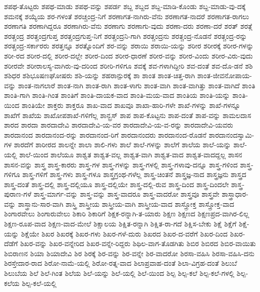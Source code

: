 {ಶಪಥ-ತೊಟ್ಟರು
ಶಪಥ-ಮಾಡು
ಶಪಥ-ವನ್ನು
ಶಪರ್ಡ
ಶಬ್ದ
ಶಬ್ದದ
ಶಬ್ದ-ಮಾಡಿ-ಕೊಂಡು
ಶಬ್ದ-ಮಾಡು-ವು-ದಕ್ಕೆ
ಶಮನಕ್ಕೆ
ಶಯ್ಯೆಯ
ಶರ-ಗಳಂತೆ
ಶರಚ್ಚಂದ್ರ-ನಿಗೆ
ಶರಣಾಗತ-ನಾಗಿರು-ವೆನು
ಶರಣಾಗತ-ನಾದರೆ
ಶರಣಾಗತ-ರಾಗಲು
ಶರಣಾಗತಿ
ಶರಣಾಗಿದ್ದರೂ
ಶರಣಾಗಿರು-ವೆನು
ಶರಣಾಗು
ಶರಣಾಗು-ವುದು
ಶರಣಾ-ದರು
ಶರಣಾ-ದರೆ
ಶರತ್
ಶರತ್ಗೆ
ಶರತ್ಚಂದ್ರ
ಶರತ್ಚಂದ್ರಗುಪ್ತ
ಶರತ್ಚಂದ್ರಗುಪ್ತ-ನಿಗೆ
ಶರತ್ಚಂದ್ರನಿ-ಗಾಗಿ
ಶರತ್ಚಂದ್ರನು
ಶರತ್ಚಂದ್ರ-ನೊಡನೆ
ಶರತ್ಚಂದ್ರ-ರನ್ನು
ಶರತ್ಚಂದ್ರ-ಸರ್ಕಾರರು
ಶರತ್ತನ್ನೂ
ಶರತ್ನೊಂದಿಗೆ
ಶರ-ವನ್ನು
ಶರಾಯಿ
ಶರಾಯಿ-ಯನ್ನು
ಶರೀರ
ಶರೀರಕ್ಕೆ
ಶರೀರ-ಗಳನ್ನು
ಶರೀ-ರದ
ಶರೀರ-ದಲ್ಲಿ
ಶರೀರ-ದಲ್ಲೇ
ಶರೀರ-ದಿಂದ
ಶರೀರ-ಧಾರಣೆ
ಶರೀರ-ವನ್ನು
ಶರೀರ-ವಿಂದು
ಶರೀರ-ವಿರು-ವುದು
ಶರೀರವೇ
ಶರೀರಾಲಸ್ಯ-ವಾಗಿರು-ವು-ದರಿಂದ
ಶರೀರಿ-ಗಳಿಗೂ
ಶವಕ್ಕೆ
ಶವ-ಗಳಾಗಿದ್ದೀರಿ
ಶವ-ದಂತೆ
ಶವ-ದೊ-ಡನೆ
ಶಶಿ
ಶಶಿಧರ
ಶಶಿಭೂಷಣಘೋಷರು
ಶಶಿ-ಯನ್ನು
ಶಹರಾನ್ಪುರಕ್ಕೆ
ಶಾ
ಶಾಂತ
ಶಾಂತ-ಚಿತ್ತ-ರಾಗಿ
ಶಾಂತ-ಜೀವನೋಪಾಯ-ವನ್ನು
ಶಾಂತ-ನಾಗಲಾರೆ
ಶಾಂತ-ನಾಗಿ
ಶಾಂತ-ರಾಗಿ
ಶಾಂತ-ಳಾಗು
ಶಾಂತ-ವಾಗಿ
ಶಾಂತ-ವಾಗಿತ್ತು
ಶಾಂತ-ವಾಗಿದೆ
ಶಾಂತಿ
ಶಾಂತಿ-ಗಾಗಿ
ಶಾಂತಿ-ಗಿಂತ
ಶಾಂತಿಗೆ
ಶಾಂತಿ-ದಾಯಕ-ವಾದ
ಶಾಂತಿ-ಮಯ-ವಾದ
ಶಾಂತಿಯ
ಶಾಂತಿ-ಯನ್ನು
ಶಾಂತಿ-ಯಿಂದ
ಶಾಂತಿಯೇ
ಶಾಕ್ತರು
ಶಾಕ್ತರೂ
ಶಾಖ-ವಾದ
ಶಾಖವೂ
ಶಾಖಾ-ಹಾರಿ-ಗಳೇ
ಶಾಖೆ-ಗಳನ್ನು
ಶಾಖೆ-ಗಳನ್ನೂ
ಶಾಖೆಗೆ
ಶಾಖೆಯ
ಶಾಖೋಪಶಾಖೆ-ಗಳಿಗೆಲ್ಲ
ಶಾನ್ಬ್ರಸ್
ಶಾಪ
ಶಾಪ-ಕೊಟ್ಟನು
ಶಾಪ-ದಂತೆ
ಶಾಪ-ವನ್ನು
ಶಾಮಲದಾಸ
ಶಾರದ
ಶಾರದಾ
ಶಾರದಾದೇವಿ
ಶಾರದಾದೇವಿ-ಯ-ವರ
ಶಾರದಾದೇವಿ-ಯ-ವ-ರನ್ನು
ಶಾರದಾದೇವಿ-ಯವರು
ಶಾರದಾನಂದ
ಶಾರದಾನಂದ-ರನ್ನು
ಶಾರದಾನಂದ-ರಿಗೆ
ಶಾರದಾನಂದರು
ಶಾರದಾನಂದ-ರೊಡನೆ
ಶಾರದಾನಂದಸ್ವಾಮಿ-ಗಳ
ಶಾರದೆಗೆ
ಶಾರೀರದ
ಶಾಲನ್ನೇ
ಶಾಲಾ
ಶಾಲಿ-ಗಳು
ಶಾಲೆ
ಶಾಲೆ-ಗಳನ್ನು
ಶಾಲೆಗೆ
ಶಾಲೆಯ
ಶಾಲೆ-ಯನ್ನು
ಶಾಲೆ-ಯಲ್ಲಿ
ಶಾಲೆ-ಯಿಂದ
ಶಾಲೆಯೂ
ಶಾಶ್ವತ
ಶಾಶ್ವತ-ವಲ್ಲ
ಶಾಶ್ವತ-ವಾಗಿ
ಶಾಶ್ವತ-ವಾದ
ಶಾಶ್ವತ-ವಾದದ್ದಲ್ಲ
ಶಾಸನ
ಶಾಸನ-ವನ್ನು
ಶಾಸ್ತ್ರ
ಶಾಸ್ತ್ರ-ಕಾರರು
ಶಾಸ್ತ್ರ-ಗಳ
ಶಾಸ್ತ್ರ-ಗಳನ್ನು
ಶಾಸ್ತ್ರ-ಗಳಲ್ಲಿ
ಶಾಸ್ತ್ರ-ಗಳಾವು-ದನ್ನೂ
ಶಾಸ್ತ್ರ-ಗಳಿಂದ
ಶಾಸ್ತ್ರ-ಗಳಿಗೂ
ಶಾಸ್ತ್ರ-ಗಳಿಗೆ
ಶಾಸ್ತ್ರ-ಗಳು
ಶಾಸ್ತ್ರ-ಗಳೂ
ಶಾಸ್ತ್ರಗ್ರಂಥ-ಗಳೆಲ್ಲ
ಶಾಸ್ತ್ರ-ಚಿಂತನೆ
ಶಾಸ್ತ್ರಜ್ಞ-ನಾದ
ಶಾಸ್ತ್ರಜ್ಞನು
ಶಾಸ್ತ್ರದ
ಶಾಸ್ತ್ರ-ದಂತೆ
ಶಾಸ್ತ್ರ-ದಲ್ಲಿ
ಶಾಸ್ತ್ರ-ದಲ್ಲಿಯೂ
ಶಾಸ್ತ್ರ-ದಲ್ಲಿಯೇ
ಶಾಸ್ತ್ರ-ದಲ್ಲಿ-ರುವ
ಶಾಸ್ತ್ರ-ದಿಂದ
ಶಾಸ್ತ್ರ-ದಿಂದಲೇ
ಶಾಸ್ತ್ರ-ಪುರಾಣ-ಗಳೆ
ಶಾಸ್ತ್ರ-ಮಾರ್ಗ-ವನ್ನು
ಶಾಸ್ತ್ರ-ವನ್ನು
ಶಾಸ್ತ್ರ-ವಾದರೂ
ಶಾಸ್ತ್ರ-ವಾದರೋ
ಶಾಸ್ತ್ರವೂ
ಶಾಸ್ತ್ರವೇ
ಶಾಸ್ತ್ರಾಧಾರ-ವನ್ನು
ಶಾಸ್ತ್ರಾನು-ಸಾರ-ವಾಗಿ
ಶಾಸ್ತ್ರಿ
ಶಾಸ್ತ್ರೀಯ
ಶಾಸ್ತ್ರೀಯ-ವಾಗಿ
ಶಾಸ್ತ್ರೀಯ-ವಾದ
ಶಾಸ್ತ್ರೋಕ್ತ
ಶಾಸ್ತ್ರೋಕ್ತ-ವಾದ
ಶಿಂಗಾರವೇಲು
ಶಿಂಗಾರುವೇಲು
ಶಿಕಾರಿ
ಶಿಕಾರಿಗೆ
ಶಿಕ್ಷಕ-ರನ್ನಾಗಿ-ತ-ಯಾರು
ಶಿಕ್ಷಣ
ಶಿಕ್ಷಣದ
ಶಿಕ್ಷಣಪ್ರದ-ವಾಗಿರ-ಲಿಲ್ಲ
ಶಿಕ್ಷಣ-ರೂಪ-ವಾದ
ಶಿಕ್ಷಣ-ವಾದ-ಮೇಲೆ
ಶಿಕ್ಷಾಲಯ
ಶಿಕ್ಷಿತ-ರನ್ನಾಗಿ
ಶಿಕ್ಷಿತ-ರಾ-ಗದೆ
ಶಿಕ್ಷಿಸ-ಬೇಕು
ಶಿಕ್ಷೆ
ಶಿಕ್ಷೆಗೆ
ಶಿಕ್ಷೆ-ಯನ್ನು
ಶಿಕ್ಷೆಯೇ
ಶಿಖರ
ಶಿಖರಕ್ಕೆ
ಶಿಖರ-ಗಳು
ಶಿಖರ-ಗಳೆ-ದುರು
ಶಿಖರದ
ಶಿಖರ-ದ-ವರೆಗೆ
ಶಿಖರ-ದಿಂದ
ಶಿಖರ-ದೆಡೆಗೆ
ಶಿಖರ-ವನ್ನು
ಶಿಖರ-ವನ್ನೇರಿದ
ಶಿಖರ-ವನ್ನೇ-ರಿದ್ದರು
ಶಿಥಿಲ-ವಾಗ-ತೊಡಗಿತು
ಶಿಬಿರ
ಶಿಬಿರದ
ಶಿಬಿರ-ವಾಯಿತು
ಶಿಬಿರಾಣನ
ಶಿಯಾ
ಶಿಯಾದೇವಿ
ಶಿರ
ಶಿರಕ್ಕೆ
ಶಿರ-ವನ್ನು
ಶಿರ-ವನ್ನೇ
ಶಿರ-ವಾದರೋ
ಶಿರಸಾ-ವಹಿಸಿ
ಶಿರಸಾ-ವಹಿಸಿ-ದನು
ಶಿರಸ್ತೇದಾರ-ರಾದ
ಶಿರೋ-ನಾಮೆ-ಯಲ್ಲಿ
ಶಿರೋ-ರತ್ನ-ವಾದ
ಶಿಲಾಪ್ರವಾಹ-ದಂತೆ
ಶಿಲಾ-ವಿಗ್ರಹ-ದಂತೆ
ಶಿಲುಬೆ
ಶಿಲುಬೆಯ
ಶಿಲೆ
ಶಿಲೆ-ಗಿಂತ
ಶಿಲೆಯ
ಶಿಲೆ-ಯನ್ನು
ಶಿಲೆ-ಯಲ್ಲಿ
ಶಿಲೆ-ಯಿಂದ
ಶಿಲ್ಪ
ಶಿಲ್ಪ-ಕಲೆ
ಶಿಲ್ಪ-ಕಲೆ-ಗಳಲ್ಲಿ
ಶಿಲ್ಪ-ಕಲೆಯ
ಶಿಲ್ಪ-ಕಲೆ-ಯಲ್ಲಿ
}
